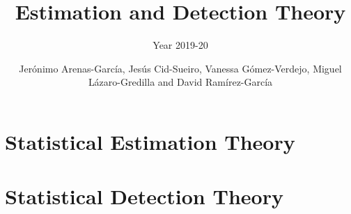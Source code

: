 \documentclass[graybox,envcountchap,sectrefs]{svmono_mod}
\begin{document}
\author{Jer\'onimo Arenas-Garc\'ia, Jes\'us Cid-Sueiro, Vanessa G\'omez-Verdejo, Miguel L\'azaro-Gredilla and David Ram\'irez-Garc\'ia}
\title{Estimation and Detection Theory}
\subtitle{Year 2019-20}
\maketitle

\frontmatter%

%
%
%
%


\tableofcontents
%

\mainmatter%

%
\chapter{Statistical Estimation Theory}











%

\chapter{Statistical Detection Theory}
\label{ch:SDT}


%


%


\backmatter%
%
%
\printindex
\end{document}
